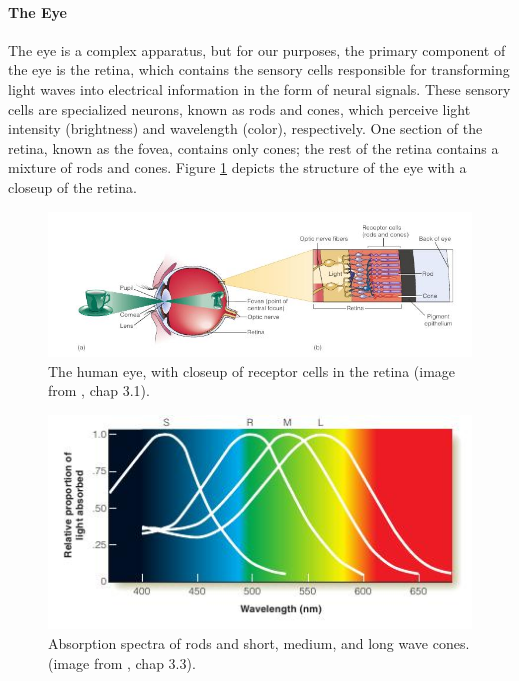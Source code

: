 \documentclass[11pt]{isuthesis}
\begin{document}
\paragraph{The Eye}
The eye is a complex apparatus, but for our purposes, the primary component of the eye is the retina, which contains the sensory cells responsible for transforming light waves into electrical information in the form of neural signals. 
These sensory cells are specialized neurons, known as rods and cones, which perceive light intensity (brightness) and wavelength (color), respectively. One section of the retina, known as the fovea, contains only cones; the rest of the retina contains a mixture of rods and cones. Figure \ref{fig:retina} depicts the structure of the eye with a closeup of the retina. 

\begin{figure}
\centering
\includegraphics[width=.8\textwidth, keepaspectratio=TRUE]{Figure/LitReview/Retina}
\caption[The human eye, with closeup of receptor cells in the retina]{The human eye, with closeup of receptor cells in the retina (image from \protect\citealt{goldstein}, chap 3.1).} \label{fig:retina}
\end{figure}

\begin{figure}
\centering
\includegraphics[width=.8\textwidth, keepaspectratio=TRUE]{Figure/LitReview/AbsorptionSpectra}
\caption[Absorption spectra of retinal cells]{Absorption spectra of rods and short, medium, and long wave cones. (image from \protect\citealt{goldstein}, chap 3.3).} \label{fig:ColorRange}
\end{figure}
\end{document}
